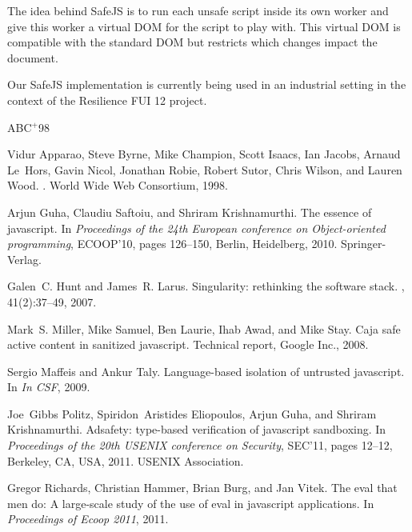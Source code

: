 \documentclass{article}
\newcommand{\safejs}{SafeJS\xspace}
\newcommand{\dom}{DOM\xspace}
\begin{document}
The idea behind \safejs is to run each unsafe script inside its own
worker and give this worker a virtual \dom for the script to play
with. This virtual \dom is compatible with the standard \dom but
restricts which changes impact the document.

Our \safejs implementation is currently being used in an industrial
setting in the context of the Resilience FUI 12 project.



\newcommand{\etalchar}[1]{$^{#1}$}
\begin{thebibliography}{ABC{\etalchar{+}}98}

\bibitem[ABC{\etalchar{+}}98]{DOM98}
Vidur Apparao, Steve Byrne, Mike Champion, Scott Isaacs, Ian Jacobs, Arnaud
  Le~Hors, Gavin Nicol, Jonathan Robie, Robert Sutor, Chris Wilson, and Lauren
  Wood.
.
\newblock World Wide Web Consortium, 1998.

Arjun Guha, Claudiu Saftoiu, and Shriram Krishnamurthi.
\newblock The essence of javascript.
\newblock In {\em Proceedings of the 24th European conference on
  Object-oriented programming}, ECOOP'10, pages 126--150, Berlin, Heidelberg,
  2010. Springer-Verlag.

Galen~C. Hunt and James~R. Larus.
\newblock Singularity: rethinking the software stack.
, 41(2):37--49, 2007.

\bibitem[MSL{\etalchar{+}}08]{Mill08a}
Mark~S. Miller, Mike Samuel, Ben Laurie, Ihab Awad, and Mike Stay.
\newblock Caja safe active content in sanitized javascript.
\newblock Technical report, Google Inc., 2008.

Sergio Maffeis and Ankur Taly.
\newblock Language-based isolation of untrusted javascript.
\newblock In {\em In CSF}, 2009.

Joe~Gibbs Politz, Spiridon~Aristides Eliopoulos, Arjun Guha, and Shriram
  Krishnamurthi.
\newblock Adsafety: type-based verification of javascript sandboxing.
\newblock In {\em Proceedings of the 20th USENIX conference on Security},
  SEC'11, pages 12--12, Berkeley, CA, USA, 2011. USENIX Association.

Gregor Richards, Christian Hammer, Brian Burg, and Jan Vitek.
\newblock The eval that men do: A large-scale study of the use of eval in
  javascript applications.
\newblock In {\em Proceedings of Ecoop 2011}, 2011.

\end{thebibliography}
\end{document}
